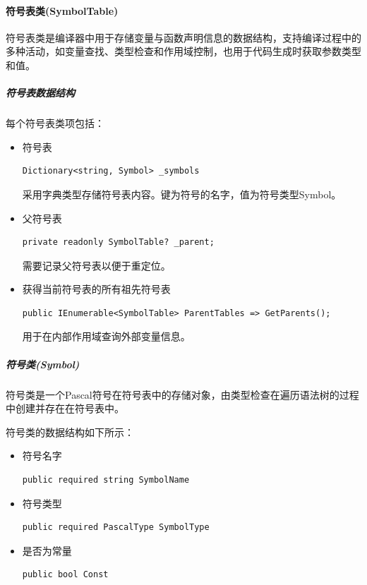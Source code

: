 \documentclass[../main.tex]{subfiles}
\begin{document}
\paragraph{符号表类(SymbolTable)} 符号表类是编译器中用于存储变量与函数声明信息的数据结构，支持编译过程中的多种活动，如变量查找、类型检查和作用域控制，也用于代码生成时获取参数类型和值。

\subparagraph{符号表数据结构}
每个符号表类项包括：
\begin{itemize} 

    \item 符号表
    
    \begin{lstlisting}[style = csharp]
        Dictionary<string, Symbol> _symbols
    \end{lstlisting}

采用字典类型存储符号表内容。键为符号的名字，值为符号类型Symbol。

    \item 父符号表
    
    \begin{lstlisting}[style = csharp]
        private readonly SymbolTable? _parent;
    \end{lstlisting}

需要记录父符号表以便于重定位。

    \item 获得当前符号表的所有祖先符号表

    \begin{lstlisting}[style = csharp]
        public IEnumerable<SymbolTable> ParentTables => GetParents();
    \end{lstlisting}

用于在内部作用域查询外部变量信息。
    
\end{itemize}

\subparagraph{符号类(Symbol)} 符号类是一个Pascal符号在符号表中的存储对象，由类型检查在遍历语法树的过程中创建并存在在符号表中。

符号类的数据结构如下所示：
\begin{itemize}
    \item 符号名字
    
    \begin{lstlisting}[style = csharp]
        public required string SymbolName
    \end{lstlisting}
    
    \item 符号类型
    
    \begin{lstlisting}[style = csharp]
        public required PascalType SymbolType
    \end{lstlisting}

    \item 是否为常量
    
    \begin{lstlisting}[style = csharp]
        public bool Const
    \end{lstlisting}

\end{itemize}
\end{document}
